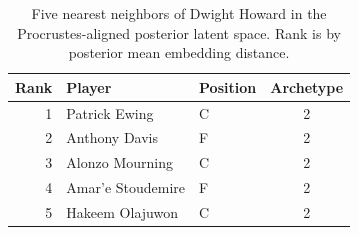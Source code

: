 \begin{table}[htbp]
  \centering\small
  \begin{tabular}{rllc}
    \toprule
    Rank & Player & Position & Archetype \\
    \midrule
    1 & Patrick Ewing & C & 2 \\
    2 & Anthony Davis & F & 2 \\
    3 & Alonzo Mourning & C & 2 \\
    4 & Amar'e Stoudemire & F & 2 \\
    5 & Hakeem Olajuwon & C & 2 \\
    \bottomrule
  \end{tabular}
  \caption{Five nearest neighbors of Dwight Howard in the Procrustes-aligned posterior latent space. Rank is by posterior mean embedding distance.}
  \label{tab:Dwight_Howard_neighbors}
\end{table}

